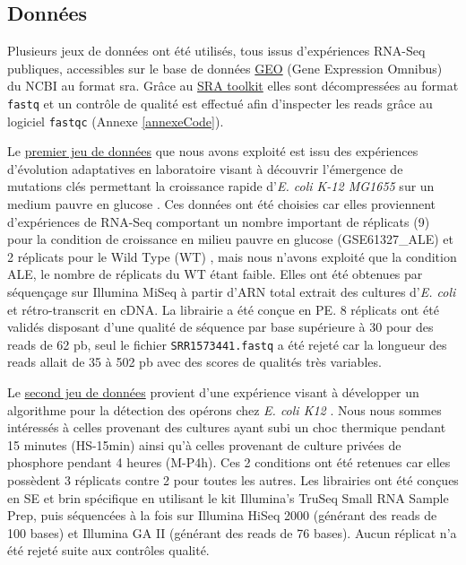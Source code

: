 \documentclass[12pt,a4paper]{report}
\begin{document}
\begin{onehalfspace}
\section*{Données}
Plusieurs jeux de données ont été utilisés, tous issus d'expériences RNA-Seq publiques, accessibles sur le base de données \href{http://www.ncbi.nlm.nih.gov/geo/}{GEO} (Gene Expression Omnibus) du NCBI au format \gls{sra}. Grâce au \href{http://www.ncbi.nlm.nih.gov/books/NBK158900/#SRA_download.how_do_i_use_the_sra_toolki}{SRA toolkit} elles sont décompressées au format \texttt{fastq} et un contrôle de qualité est effectué afin d'inspecter les \gls{reads} grâce au logiciel \texttt{fastqc} (Annexe \ref{annexeCode}).

Le \href{http://www.ncbi.nlm.nih.gov/geo/query/acc.cgi?acc=GSE61327}{premier jeu de données} que nous avons exploité est issu des expériences d'évolution adaptatives en laboratoire visant à découvrir l'émergence de mutations clés permettant la croissance rapide d'\textit{E. coli K-12 MG1655} sur un medium pauvre en glucose \citep{Lacroix2014}. Ces données ont été choisies car elles proviennent d'expériences de RNA-Seq comportant un nombre important de réplicats (9) pour la condition de croissance en milieu pauvre en glucose (GSE61327\_ALE) et 2 réplicats pour le Wild Type (WT) , mais nous n'avons exploité que la condition ALE, le nombre de réplicats du WT étant faible. Elles ont été obtenues par séquençage sur Illumina MiSeq à partir d'ARN total extrait des cultures d'\textit{E. coli} et rétro-transcrit en cDNA. La librairie a été conçue en \gls{PE}. 8 réplicats ont été validés disposant d'une qualité de séquence par base supérieure à 30 pour des reads de 62 pb, seul le fichier \texttt{SRR1573441.fastq} a été rejeté car la longueur des reads allait de 35 à 502 pb avec des scores de qualités très variables.

Le \href{http://bioinfolab.uncc.edu/TruHmm_package/raw_data/}{second jeu de données} provient d'une expérience visant à développer un algorithme pour la détection des opérons chez \textit{E. coli K12} \citep{Li2013}. Nous nous sommes intéressés à celles provenant des cultures ayant subi un choc thermique pendant 15 minutes (HS-15min) ainsi qu'à celles provenant de culture privées de phosphore pendant 4 heures (M-P4h). Ces 2 conditions ont été retenues car elles possèdent 3 réplicats contre 2 pour toutes les autres. Les librairies ont été conçues en \gls{SE} et brin spécifique en utilisant le kit Illumina’s TruSeq Small RNA Sample Prep, puis séquencées à la fois sur Illumina HiSeq 2000 (générant des reads de 100 bases) et Illumina GA II (générant des reads de 76 bases). Aucun réplicat n'a été rejeté suite aux contrôles qualité.


\end{onehalfspace}
\end{document}
